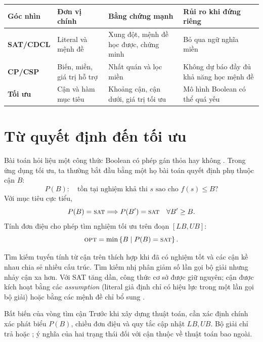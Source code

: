 \begin{center}
\label{tab:three-perspectives}
\begin{tabularx}{\textwidth}{@{}>{\bfseries\sffamily}p{}YYY@{}}
\toprule
Góc nhìn & Đơn vị chính & Bằng chứng mạnh & Rủi ro khi đứng riêng\\
\midrule
SAT/CDCL & Literal và mệnh đề & Xung đột, mệnh đề học được, chứng minh &
Bỏ qua ngữ nghĩa miền\\
CP/CSP & Biến, miền, giá trị hỗ trợ & Nhất quán và lọc miền &
Không dự báo đầy đủ khả năng học mệnh đề\\
Tối ưu & Cận và hàm mục tiêu & Khoảng cận, cận dưới, giá trị tối ưu &
Mô hình Boolean có thể quá yếu\\
\bottomrule
\end{tabularx}
\end{center}

\section{Từ quyết định đến tối ưu}

Bài toán \SAT hỏi liệu một công thức Boolean có phép gán thỏa hay không
\parencite{cook1971complexity,biere2009handbook}. Trong ứng dụng tối ưu, ta
thường bắt đầu bằng một họ bài toán quyết định phụ thuộc cận \(B\):
\[
  P(B):\quad
  \text{tồn tại nghiệm khả thi }s\text{ sao cho }f(s)\le B?
\]
Với mục tiêu cực tiểu,
\[
  P(B)=\textsc{sat}\Longrightarrow P(B')=\textsc{sat}
  \quad\forall B'\ge B.
\]
Tính đơn điệu cho phép tìm nghiệm tối ưu trên đoạn \([LB,UB]\):
\[
  \textsc{opt}=\min\left\{B\mid P(B)=\textsc{sat}\right\}.
\]

Tìm kiếm tuyến tính từ cận trên thích hợp khi đã có nghiệm tốt và các cận kề
nhau chia sẻ nhiều cấu trúc. Tìm kiếm nhị phân giảm số lần gọi bộ giải nhưng
nhảy cận xa hơn. Với SAT tăng dần, công thức cơ sở được giữ nguyên; cận được
kích hoạt bằng các \emph{assumption} (literal giả định chỉ có hiệu lực trong
một lần gọi bộ giải) hoặc bằng các mệnh đề chỉ bổ sung
\parencite{een2003incremental}.

\begin{designrule}{Bất biến của vòng tìm cận}
Trước khi xây dựng thuật toán, cần xác định chính xác phát biểu \(P(B)\), chiều đơn điệu và
quy tắc cập nhật \(LB,UB\). Bộ giải chỉ trả \SAT hoặc \UNSAT; ý nghĩa của hai
trạng thái đối với cận thuộc về thuật toán bao ngoài.
\end{designrule}

